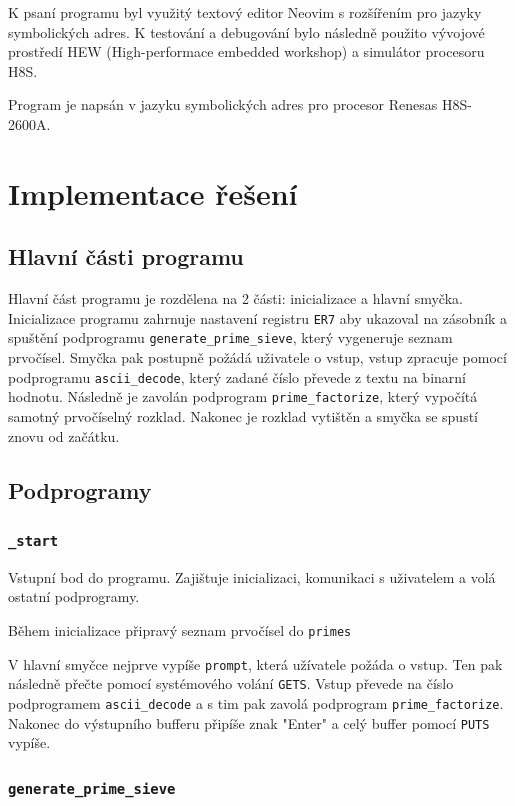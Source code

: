 \documentclass[12pt]{article}
\newcommand{\code}[1]{\colorbox{light-gray}{\mbox{\texttt{#1}}}}
\begin{document}
K psaní programu byl využitý textový editor Neovim s rozšířením pro jazyky symbolických
adres. K testování a debugování bylo následně použito vývojové prostředí HEW (High-performace
embedded workshop) a simulátor procesoru H8S.

Program je napsán v jazyku symbolických adres pro procesor Renesas H8S-2600A.

\section{Implementace řešení}

\subsection{Hlavní části programu}

Hlavní část programu je rozdělena na 2 části: inicializace a hlavní smyčka. Inicializace programu
zahrnuje nastavení registru \code{ER7} aby ukazoval na zásobník a spuštění podprogramu
\code{generate\_prime\_sieve}, který vygeneruje seznam prvočísel. Smyčka pak postupně požádá
uživatele o vstup, vstup zpracuje pomocí podprogramu \code{ascii\_decode}, který zadané číslo
převede z textu na binarní hodnotu. Následně je zavolán podprogram \code{prime\_factorize}, který
vypočítá samotný prvočíselný rozklad. Nakonec je rozklad vytištěn a smyčka se spustí znovu od
začátku.

\subsection{Podprogramy}

\subsubsection{\code{\_start}}

Vstupní bod do programu. Zajištuje inicializaci, komunikaci s uživatelem a volá ostatní
podprogramy.

Během inicializace připravý seznam prvočísel do \code{primes}

V hlavní smyčce nejprve vypíše \code{prompt}, která užívatele požáda o vstup. Ten pak následně
přečte pomocí systémového volání \code{GETS}. Vstup převede na číslo podprogramem
\code{ascii\_decode} a s tim pak zavolá podprogram \code{prime\_factorize}. Nakonec do výstupního
bufferu připíše znak "Enter" a celý buffer pomocí \code{PUTS} vypíše.

\subsubsection{\code{generate\_prime\_sieve}}
\end{document}
